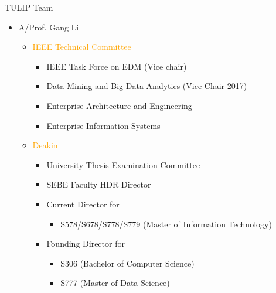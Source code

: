 \documentclass[
 size=14pt,
 paper=smartboard,  %
 mode=present, 		%
 display=slides, 	%
 style=tuliplab,  	%
 pauseslide,
 fleqn,leqno]{powerdot}
\begin{document}
\begin{slide}{TULIP Team}
    \begin{itemize}
      \item A/Prof. Gang Li
      \begin{itemize}
        \item \textcolor{orange}{IEEE Technical Committee}
         \begin{itemize}
           \item IEEE Task Force on EDM (Vice chair)
           \item Data Mining and Big Data Analytics (Vice Chair 2017)
           \item Enterprise Architecture and Engineering
           \item Enterprise Information Systems
         \end{itemize}
        \item \textcolor{orange}{Deakin}
          \begin{itemize}
            \item University Thesis Examination Committee
            \item SEBE Faculty HDR Director
            \item Current Director for
                \begin{itemize}
                  \item S578/S678/S778/S779 (Master of Information Technology)
                \end{itemize}
            \item Founding Director for
                \begin{itemize}
                  \item S306 (Bachelor of Computer Science)
                  \item S777 (Master of Data Science)
                \end{itemize}
          \end{itemize}
      \end{itemize}
    \end{itemize}


\end{slide}
\end{document}
